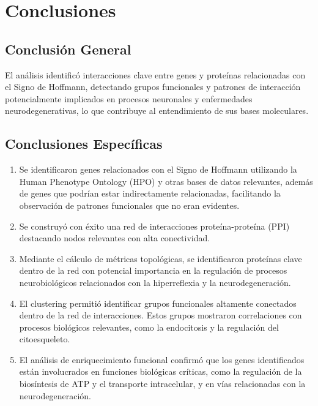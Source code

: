 \section{Conclusiones}

\subsection{Conclusión General}

El análisis identificó interacciones clave entre genes y proteínas relacionadas con el Signo de Hoffmann, detectando grupos funcionales y patrones de interacción potencialmente implicados en procesos neuronales y enfermedades neurodegenerativas, lo que contribuye al entendimiento de sus bases moleculares.

\subsection{Conclusiones Específicas}

\begin{enumerate}
	\item Se identificaron genes relacionados con el Signo de Hoffmann utilizando la Human Phenotype Ontology (HPO) y otras bases de datos relevantes, además de genes que podrían estar indirectamente relacionadas, facilitando la observación de patrones funcionales que no eran evidentes.
	
	\item Se construyó con éxito una red de interacciones proteína-proteína (PPI) destacando nodos relevantes con alta conectividad.
	
	\item Mediante el cálculo de métricas topológicas, se identificaron proteínas clave dentro de la red con potencial importancia en la regulación de procesos neurobiológicos relacionados con la hiperreflexia y la neurodegeneración.
	
	\item El clustering permitió identificar grupos funcionales altamente conectados dentro de la red de interacciones. Estos grupos mostraron correlaciones con procesos biológicos relevantes, como la endocitosis y la regulación del citoesqueleto.
	
	\item El análisis de enriquecimiento funcional confirmó que los genes identificados están involucrados en funciones biológicas críticas, como la regulación de la biosíntesis de ATP y el transporte intracelular, y en vías relacionadas con la neurodegeneración.
\end{enumerate}

